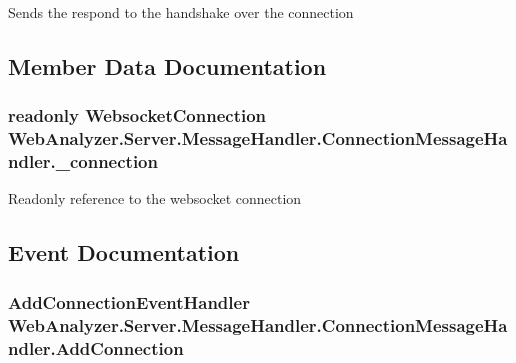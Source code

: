 Sends the respond to the handshake over the connection 



\subsection{Member Data Documentation}
\hypertarget{class_web_analyzer_1_1_server_1_1_message_handler_1_1_connection_message_handler_ac9450ddba733401319fb68606dcfd3a3}{}
\subsubsection[{\+\_\+connection}]{\setlength{\rightskip}{0pt plus 5cm}readonly {\bf Websocket\+Connection} Web\+Analyzer.\+Server.\+Message\+Handler.\+Connection\+Message\+Handler.\+\_\+connection\hspace{0.3cm}{\ttfamily [private]}}\label{class_web_analyzer_1_1_server_1_1_message_handler_1_1_connection_message_handler_ac9450ddba733401319fb68606dcfd3a3}


Readonly reference to the websocket connection 



\subsection{Event Documentation}
\hypertarget{class_web_analyzer_1_1_server_1_1_message_handler_1_1_connection_message_handler_a10b402c23b0015efb4b3643a064e7f09}{}
\subsubsection[{Add\+Connection}]{\setlength{\rightskip}{0pt plus 5cm}Add\+Connection\+Event\+Handler Web\+Analyzer.\+Server.\+Message\+Handler.\+Connection\+Message\+Handler.\+Add\+Connection}\label{class_web_analyzer_1_1_server_1_1_message_handler_1_1_connection_message_handler_a10b402c23b0015efb4b3643a064e7f09}


